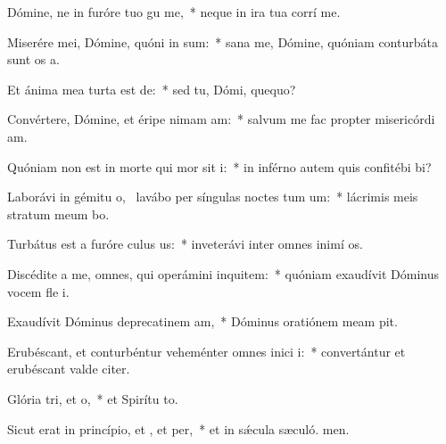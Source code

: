 \item Dómine, ne in furóre tuo gu me,~* neque in ira tua corrí me.
\item Miserére mei, Dómine, quóni in sum:~* sana me, Dómine, quóniam conturbáta sunt os a.
\item Et ánima mea turta est de:~* sed tu, Dómi, quequo?
\item Convértere, Dómine, et éripe nimam am:~* salvum me fac propter misericórdi am.
\item Quóniam non est in morte qui mor sit i:~* in inférno autem quis confitébi bi?
\item Laborávi in gémitu o,~\pscross{} lavábo per síngulas noctes tum um:~* lácrimis meis stratum meum bo.
\item Turbátus est a furóre culus us:~* inveterávi inter omnes inimí os.
\item Discédite a me, omnes, qui operámini inquitem:~* quóniam exaudívit Dóminus vocem fle i.
\item Exaudívit Dóminus deprecatinem am,~* Dóminus oratiónem meam pit.
\item Erubéscant, et conturbéntur veheménter omnes inici i:~* convertántur et erubéscant valde citer.
\item Glória tri, et o,~* et Spirítu to.
\item Sicut erat in princípio, et , et per,~* et in sǽcula sæculó. men.
